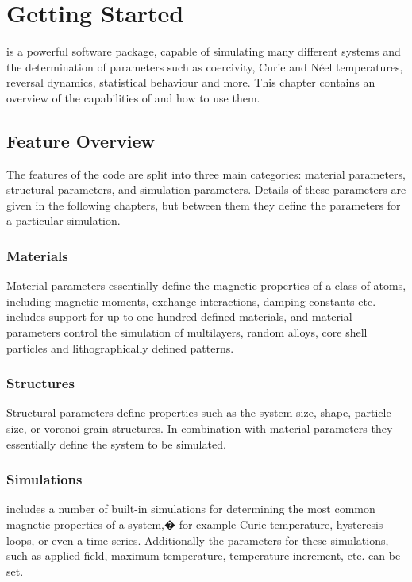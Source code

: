 \chapter{Getting Started}\label{chap:gettingstarted}

\vampire is a powerful software package, capable of simulating many different systems and the determination of parameters such as coercivity, Curie and N\'eel temperatures, reversal dynamics, statistical behaviour and more. This chapter contains an overview of the capabilities of \vampire and how to use them.

\section*{Feature Overview}
The features of the \vampire code are split into three main categories: material parameters, structural parameters, and simulation parameters. Details of these parameters are given in the following chapters, but between them they define the parameters for a particular simulation.

\subsection*{Materials}
Material parameters essentially define the magnetic properties of a class of atoms, including magnetic moments, exchange interactions, damping constants etc. \vampire includes support for up to one hundred defined materials, and material parameters control the simulation of multilayers, random alloys, core shell particles and lithographically defined patterns.

\subsection*{Structures}
Structural parameters define properties such as the system size, shape, particle size, or voronoi grain structures. In combination with material parameters they essentially define the system to be simulated. 

\subsection*{Simulations}
\vampire includes a number of built-in simulations for determining the most common magnetic properties of a system,� for example Curie temperature, hysteresis loops, or even a time series. Additionally the parameters for these simulations, such as applied field, maximum temperature, temperature increment, etc. can be set. 

